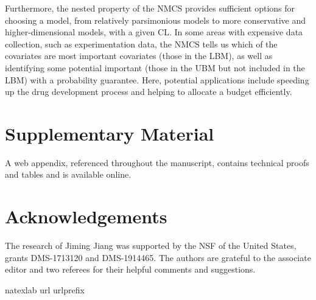 \documentclass[12pt]{article} %
\theoremstyle{definition}
\begin{document}
Furthermore, the nested property of the NMCS provides sufficient options for choosing a model, from relatively parsimonious models to more conservative and higher-dimensional models, with a given CL. In some areas with expensive data collection, such as 
experimentation data, the NMCS tells us which of the covariates are most important covariates (those in the LBM), as well as identifying some potential important (those in the UBM but not included in the LBM) with a probability guarantee. Here, potential applications include speeding up the drug development process and helping to allocate a budget efficiently.


\label{lastpage}


\section*{Supplementary Material}

A web appendix, referenced throughout the manuscript, contains technical proofs and tables and is available online.\vspace*{-8pt}

\section*{Acknowledgements}

The research of Jiming Jiang was supported by the NSF of the United States, grants DMS-1713120 and DMS-1914465. The authors are grateful to the associate editor and two referees for their helpful comments and suggestions.

\par


\bibhang=1.7pc
\bibsep=2pt
\fontsize{9}{14pt plus.8pt minus .6pt}\selectfont
\renewcommand\bibname{\large \bf References}
\expandafter\ifx\csname
natexlab\endcsname\relax\def\natexlab#1{#1}\fi
\expandafter\ifx\csname url\endcsname\relax
  \def\url#1{\texttt{#1}}\fi
\expandafter\ifx\csname urlprefix\endcsname\relax\def\urlprefix{URL}\fi
\end{document}
